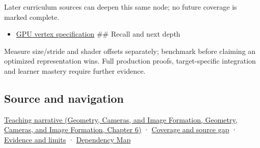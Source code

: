 Later curriculum sources can deepen this same node; no future coverage is marked complete.

\begin{itemize}
\tightlist
\item
  \hyperref[appendix-749ba51a6c25]{GPU vertex specification} \#\# Recall and next depth
\end{itemize}

Measure size/stride and shader offsets separately; benchmark before claiming an optimized representation wins. Full production proofs, target-specific integration and learner mastery require further evidence.

\subsection{Source and navigation}\label{appendix-26bf6bf2fb8b-source-and-navigation}

\href{../03-Geometry-Cameras-and-Image-Formation/main.pdf\#nameddest=02-foundations-ii-ch037-storage-and-computation-can-choose-different-layouts}{Teaching narrative (Geometry, Cameras, and Image Formation, Geometry, Cameras, and Image Formation, Chapter 6)} · \hyperref[appendix-fd090d982a15-phase-6---parts-501-600]{Coverage and source gap} · \hyperref[appendix-a103e7846d21-phase-6---source-analysis-and-verification]{Evidence and limits} · \hyperref[appendix-4ad47bdd269a]{Dependency Map}
